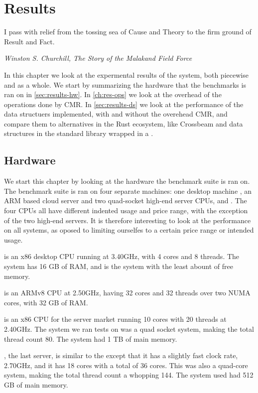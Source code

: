 \chapter{Results\label{ch:results}}

\epigraph{I pass with relief from the tossing sea of Cause and Theory to the firm ground of Result
and Fact.} {\textit{Winston S. Churchill, The Story of the Malakand Field Force}}

In this chapter we look at the expermental results of the system, both piecewise and as a whole.
We start by summarizing the hardware that the benchmarks is ran on in \cref{sec:results-hw}. In
\cref{ch:res-ops} we look at the overhead of the operations done by CMR\@. In \cref{sec:results-ds} we
look at the performance of the data structuers implemented, with and without the overehead CMR, and
compare them to alternatives in the Rust ecosystem, like Crossbeam\cite{crossbeam} and data
structures in the standard library wrapped in a .

\clearpage

\section{Hardware\label{sec:results-hw}}

We start this chapter by looking at the hardware the benchmark suite is ran on.  The benchmark
suite is ran on four separate machines: one desktop machine \gribb{}, an ARM based cloud server
\scaleway{} and two quad-socket high-end server CPUs, \mitserver{} and \daslab{}.  The four CPUs
all have different indented usage and price range, with the exception of the two high-end servers.
It is therefore interesting to look at the performance on all systems, as oposed to limiting
ourselfes to a certain price range or intended usage.

\gribb{} is an x86 desktop CPU running at 3.40GHz, with 4 cores and 8 threads. The system has 16 GB of
RAM, and is the system with the least abount of free memory.

\scaleway{} is an ARMv8 CPU at 2.50GHz, having 32 cores and 32 threads over two NUMA cores, with 32
GB of RAM\@.

\mitserver{} is an x86 CPU for the server market running 10 cores with 20 threads at 2.40GHz. The
system we ran tests on was a quad socket system, making the total thread count 80. The system had 1
TB of main memory.

\daslab{}, the last server, is similar to the \mitserver{} except that it has a slightly fast clock
rate, 2.70GHz, and it has 18 cores with a total of 36 cores. This was also a quad-core system,
making the total thread count a whopping 144. The system used had 512 GB of main memory.


